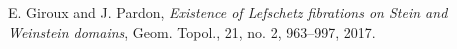 \documentclass[11pt]{amsart}
\begin{document}
\begin{thebibliography}{}
\begin{comment}
\bibitem[G02]{Giroux:ContactOB}
E. Giroux, \textit{G\'{e}om\'{e}trie de contact: de la dimension trois vers les dimensions sup\'{e}rieures}, Proceedings of the International Congress of Mathematicians, Vol. II, Higher Ed. Press, Beijing, p.405-414, 2002.

\bibitem[Girou17]{Giroux:IdealLiouville}
E. Giroux, \textit{Ideal Liouville Domains - a cool gadget}, J. Symplectic Geom., Volume 18, p.769–790, 2017.
\end{comment}

E. Giroux and J. Pardon, \textit{Existence of Lefschetz fibrations on Stein and Weinstein domains}, Geom. Topol., 21, no. 2, 963–997, 2017.

\begin{comment}
\bibitem[Go98]{Gompf:Handlebodies}
R. Gompf, \textit{Handlebody construction of Stein surfaces}, Ann. of Math. 148,
p.619-693, 1998.



\bibitem[GS99]{GS:KirbyCalculus}
R. Gopf and A. Stipsicz, \textit{4-manifolds and Kirby Calculus}, Graduate Studies in Mathematics 20, Amer. Math. Society, Providence, RI, 1999.

\bibitem[Gr85]{Gromov:JCurves}
M. Gromov, \textit{Pseudoholomorphic curves in symplectic manifolds}, Invent. Math, Volume 82, p.307–347, 1985.


\bibitem[G14]{Gutt:Normal}
J. Gutt, \textit{Normal Forms for Symplectic Matrices}, Portugalia Mathematicae, vol. 71, p.109-139, 2014.



\bibitem[Ha02]{Hatcher:AlgebraicTopology}
A. Hatcher, \textit{Algebraic topology}, Cambridge University Press, Cambridge, 2002.

\bibitem[HW]{HW:Cop}
N. Higstons, N. Wahl, {\em Products and coproducts in string topology}, arXiv:1709.06839v1, 2017.

\bibitem[Hi03]{Hind:Filling}
R. Hind, \textit{Stein fillings of lens spaces}, Commun. Contemp. Math. 5, no. 6, p.967–982, 2003.

\bibitem[Hof93]{Hofer:OTWeinstein}
H. Hofer, \textit{Pseudoholomorphic curves in symplectizations with applications to the Weinstein conjecture in dimension three}, Inv. Math., Volume 114, p.515-563, 1993.


\bibitem[HWZ96]{HWZ:Asymptotics}
H. Hofer, K. Wysocki and E. Zehnder, \textit{Properties of pseudoholomorphic curves in symplectizations I: Asymptotics}, Ann. Inst. H. Poincar{`e} Anal. Non Lin{`e}aire 13, p.337–37, 1996.


\end{comment}
\end{thebibliography}
\end{document}
